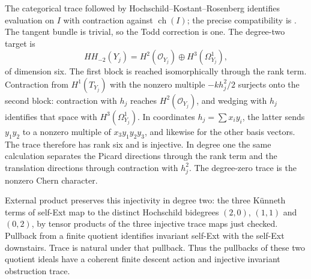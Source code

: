 \documentclass[11pt]{article}
\theoremstyle{definition}
\theoremstyle{remark}
\begin{document}
The categorical trace followed by Hochschild--Kostant--Rosenberg identifies evaluation on $I$ with contraction against $\operatorname{ch}(I)$; the precise compatibility is \cite[Proposition~6.2.1, Corollary~6.3.2 and Theorem~6.4.2, author pp.~29--31]{BFHH}. The tangent bundle is trivial, so the Todd correction is one. The degree-two target is
\[
 HH_{-2}(Y_j)=H^2(\mathcal O_{Y_j})\oplus H^3(\Omega^1_{Y_j}),
\]
of dimension six. The first block is reached isomorphically through the rank term. Contraction from $H^1(T_{Y_j})$ with the nonzero multiple $-kh_j^2/2$ surjects onto the second block: contraction with $h_j$ reaches $H^2(\mathcal O_{Y_j})$, and wedging with $h_j$ identifies that space with $H^3(\Omega^1_{Y_j})$. In coordinates $h_j=\sum x_iy_i$, the latter sends $y_1y_2$ to a nonzero multiple of $x_3y_1y_2y_3$, and likewise for the other basis vectors. The trace therefore has rank six and is injective. In degree one the same calculation separates the Picard directions through the rank term and the translation directions through contraction with $h_j^2$. The degree-zero trace is the nonzero Chern character.

External product preserves this injectivity in degree two: the three K\"unneth terms of self-Ext map to the distinct Hochschild bidegrees $(2,0)$, $(1,1)$ and $(0,2)$, by tensor products of the three injective trace maps just checked. Pullback from a finite quotient identifies invariant self-Ext with the self-Ext downstairs. Trace is natural under that pullback. Thus the pullbacks of these two quotient ideals have a coherent finite descent action and injective invariant obstruction trace.
\end{document}
